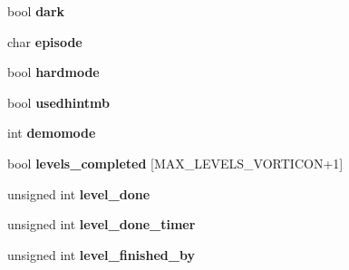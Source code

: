 \begin{DoxyCompactItemize}
\item 
\hypertarget{struct_old_save_game_format_1_1st_level_control_af110b8eda4745297a3b759bbf326006a}{
bool {\bfseries dark}}
\label{struct_old_save_game_format_1_1st_level_control_af110b8eda4745297a3b759bbf326006a}

\item 
\hypertarget{struct_old_save_game_format_1_1st_level_control_a45d22d7d13ac336a6ad61513d62a0439}{
char {\bfseries episode}}
\label{struct_old_save_game_format_1_1st_level_control_a45d22d7d13ac336a6ad61513d62a0439}

\item 
\hypertarget{struct_old_save_game_format_1_1st_level_control_a66a8d859facca858b99a3c10165fe414}{
bool {\bfseries hardmode}}
\label{struct_old_save_game_format_1_1st_level_control_a66a8d859facca858b99a3c10165fe414}

\item 
\hypertarget{struct_old_save_game_format_1_1st_level_control_a56c2a7b4746783830d832954cbcd734d}{
bool {\bfseries usedhintmb}}
\label{struct_old_save_game_format_1_1st_level_control_a56c2a7b4746783830d832954cbcd734d}

\item 
\hypertarget{struct_old_save_game_format_1_1st_level_control_ac7c3464c8b8cc04b4216a69b48d88683}{
int {\bfseries demomode}}
\label{struct_old_save_game_format_1_1st_level_control_ac7c3464c8b8cc04b4216a69b48d88683}

\item 
\hypertarget{struct_old_save_game_format_1_1st_level_control_a70059fbfa1d54b40c01290e8dd83f5a2}{
bool {\bfseries levels\_\-completed} \mbox{[}MAX\_\-LEVELS\_\-VORTICON+1\mbox{]}}
\label{struct_old_save_game_format_1_1st_level_control_a70059fbfa1d54b40c01290e8dd83f5a2}

\item 
\hypertarget{struct_old_save_game_format_1_1st_level_control_aef538df141e87bf5058265e64fa9b526}{
unsigned int {\bfseries level\_\-done}}
\label{struct_old_save_game_format_1_1st_level_control_aef538df141e87bf5058265e64fa9b526}

\item 
\hypertarget{struct_old_save_game_format_1_1st_level_control_abd0aad52052202f090f937cfb4920b76}{
unsigned int {\bfseries level\_\-done\_\-timer}}
\label{struct_old_save_game_format_1_1st_level_control_abd0aad52052202f090f937cfb4920b76}

\item 
\hypertarget{struct_old_save_game_format_1_1st_level_control_a6579abfecae527626da03b42656774b5}{
unsigned int {\bfseries level\_\-finished\_\-by}}
\label{struct_old_save_game_format_1_1st_level_control_a6579abfecae527626da03b42656774b5}


\end{DoxyCompactItemize}
